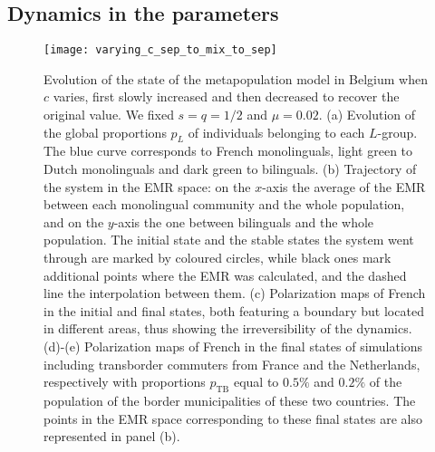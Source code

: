 \documentclass[../thesis.tex]{subfiles}
\begin{document}
\subsection{Dynamics in the parameters}
\begin{figure}
\centering
    \texttt{[image: varying\_c\_sep\_to\_mix\_to\_sep]}
    \caption{Evolution of the state of the metapopulation model in Belgium when $c$
    varies, first slowly increased and then decreased to recover the original value. We
    fixed $s=q=1/2$ and $\mu=0.02$. (a) Evolution of the global proportions
    $p_L$ of individuals belonging to each $L$-group. The blue curve corresponds to
    French monolinguals, light green to Dutch monolinguals and dark green to bilinguals.
    (b) Trajectory of the system in the EMR space: on the $x$-axis the average
    of the EMR between each monolingual community and the whole population, and on the
    $y$-axis the one between bilinguals and the whole population. The initial state and
    the stable states the system went through are marked by coloured circles, while black
    ones mark additional points where the EMR was calculated, and the dashed line the
    interpolation between them. (c) Polarization maps of French in the initial
    and final states, both featuring a boundary but located in different areas, thus
    showing the irreversibility of the dynamics. (d)-(e) Polarization
    maps of French in the final states of simulations including transborder commuters
    from France and the Netherlands, respectively with proportions $p_{\text{TB}}$ equal
    to $0.5\%$ and $0.2\%$ of the population of the border municipalities of these two
    countries. The points in the EMR space corresponding to these final states are also
    represented in panel (b).}
    \label{fig:varying_c_sep_to_mix_to_sep}
\end{figure}
    
\end{document}
